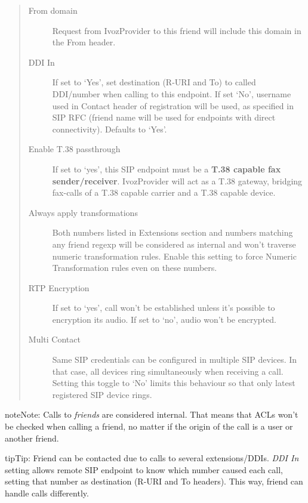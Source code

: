 \documentclass[letterpaper,10pt,english]{sphinxmanual}
\begin{document}
\begin{quote}
\begin{description}
\item[{From domain}] \leavevmode
Request from IvozProvider to this friend will include this domain in
the From header.

\item[{DDI In}] \leavevmode
If set to `Yes', set destination (R-URI and To) to called DDI/number when calling to this endpoint. If set `No', username
used in Contact header of registration will be used, as specified in SIP RFC (friend name will be used for
endpoints with direct connectivity). Defaults to `Yes'.

\item[{Enable T.38 passthrough}] \leavevmode
If set to `yes', this SIP endpoint must be a \textbf{T.38 capable fax sender/receiver}. IvozProvider
will act as a T.38 gateway, bridging fax-calls of a T.38 capable carrier and a T.38 capable device.

\item[{Always apply transformations}] \leavevmode
Both numbers listed in Extensions section and numbers matching any friend regexp will be considered as internal and
won't traverse numeric transformation rules.  Enable this setting to force Numeric Transformation rules even on these numbers.

\item[{RTP Encryption}] \leavevmode
If set to `yes', call won't be established unless it's possible to encryption its audio. If set to `no',
audio won't be encrypted.

\item[{Multi Contact}] \leavevmode
Same SIP credentials can be configured in multiple SIP devices. In that case, all devices ring
simultaneously when receiving a call. Setting this toggle to `No' limits this behaviour so that
only latest registered SIP device rings.

\end{description}
\end{quote}

\begin{notice}{note}{Note:}
Calls to \emph{friends} are considered internal. That means that ACLs won't
be checked when calling a friend, no matter if the origin of the call
is a user or another friend.
\end{notice}

\begin{notice}{tip}{Tip:}
Friend can be contacted due to calls to several extensions/DDIs. \emph{DDI In} setting allows remote SIP endpoint to
know which number caused each call, setting that number as destination (R-URI and To headers). This way, friend
can handle calls differently.
\end{notice}
\end{document}
